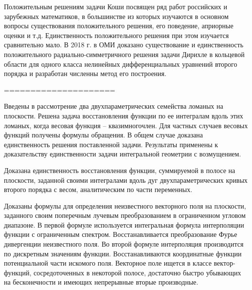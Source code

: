 




Положительным решениям задачи Коши посвящен ряд
работ российских и зарубежных математиков, в большинстве из которых изучаются в основном
вопросы существования положительного решения, его поведение,
априорные оценки и т.д.
Единственность положительного решения при этом изучается сравнительно мало.
В 2018 г. в ОМИ доказано существование и единственность положительного радиально-симметричного решения задачи Дирихле в кольцевой
области для одного класса нелинейных дифференциальных уравнений второго порядка и разработан численны метод его построения.






=====================







Введены в рассмотрение два двухпараметрических семейства ломаных на плоскости. Решена задача восстановления функции по ее интегралам вдоль этих ломаных, когда весовая функция – квазимногочлен. Для частных случаев весовых функций получены формулы обращения. В общем случае доказана единственность решения поставленной задачи. Результаты применены к доказательству единственности задачи интегральной геометрии с возмущением.


Доказана единственность восстановления функции, суммируемой в полосе на плоскости, заданной своими интегралами вдоль дуг двухпараметрических кривых второго порядка с весом, аналитическим по части переменных.

Доказаны формулы для определения неизвестного векторного поля на плоскости, заданного своим поперечным лучевым преобразованием в ограниченном угловом диапазоне. В первой формуле используется интегральная формула интерполяции функции с ограниченным спектром. Восстанавливается преобразование Фурье дивергенции неизвестного поля. Во второй формуле интерполяция производится по дискретным значениям функции. Восстанавливаются координатные функции потенциальной части искомого поля. Векторное поле ищется в классе вектор-функций, сосредоточенных в некоторой полосе, достаточно быстро убывающих на бесконечности и имеющих непрерывные вторые производные.

